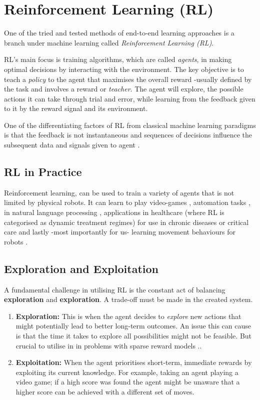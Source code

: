 \section{Reinforcement Learning (RL)}\label{sec:rl}
  One of the tried and tested methods of end-to-end learning approaches is a branch under machine learning called \emph{Reinforcement Learning (RL)}. 


  RL's main focus is training algorithms, which are called \emph{agents}, in making optimal decisions by interacting with the environment. The key objective is to teach a \emph{policy} to the agent that maximises the overall reward -usually defined by the task and involves a reward or \emph{teacher}. The agent will explore, the possible actions it can take through trial and error, while learning from the feedback given to it by the reward signal and its environment.

  One of the differentiating factors of RL from classical machine learning paradigms is that the feedback is not instantaneous and sequences of decisions influence the subsequent data and signals given to agent \cite{silver2015}.

\subsection{RL in Practice}
  Reinforcement learning, can be used to train a variety of agents that is not limited by physical robots. It can learn to play video-games \cite{comi2018}, automation tasks \cite{} , in natural language processing \cite{paulus2017deepreinforcedmodelabstractive}, applications in healthcare (where RL is categorised as dynamic treatment regimes) for use in chronic diseases or critical care \cite{yu2020reinforcementlearninghealthcaresurvey} and lastly -most importantly for us- learning movement behaviours for robots \cite{}.

  \subsection{Exploration and Exploitation}
  
  A fundamental challenge in utilising RL is the constant act of balancing \textbf{exploration} and \textbf{exploration}. A trade-off must be made in the created system.
  \begin{enumerate}
    \item \textbf{Exploration:}
    This is when the agent decides to \emph{explore} new actions that might potentially lead to better long-term outcomes. An issue this can cause is that the time it takes to explore all possibilities might not be feasible. But crucial to utilise in in problems with sparse reward models \cite{}..
    \item \textbf{Exploitation:}
    When the agent prioritises short-term, immediate rewards by exploiting its current knowledge. For example, taking an agent playing a video game; if a high score was found the agent might be unaware that a higher score can be achieved with a different set of moves. 
  \end{enumerate}

